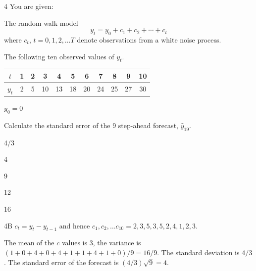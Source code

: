\begin{question}{4}
You are given:
\begin{given}
\item The random walk model
\[ y_t = y_0 + c_1 + c_2 + \cdots + c_t \]
where $c_t,\, t = 0,1,2,\ldots T$ denote observations from a white noise process.
\item The following ten observed values of $y_t$.
\begin{center}
\begin{tabular}{|c|c|c|c|c|c|c|c|c|c|c|}
\hline
$t$   & 1 & 2 & 3  & 4  & 5  & 6  & 7  & 8  & 9  & 10 \\ \hline
$y_t$ & 2 & 5 & 10 & 13 & 18 & 20 & 24 & 25 & 27 & 30 \\ \hline
\end{tabular}
\end{center}
\item $y_0 = 0$
\end{given}

Calculate the standard error of the 9 step-ahead forecast, $\hat{y}_{19}$.

\begin{choices}
\item 4/3
\item 4
\item 9
\item 12
\item 16
\end{choices}
\end{question}
\begin{solution}{4}{B}
$c_t = y_t - y_{t-1}$ and hence $c_1, c_2, \ldots c_{10} = 2,3,5,3,5,2,4,1,2,3.$

The mean of the $c$ values is 3, the variance is $(1+0+4+0+4+1+1+4+1+0)/9 = 16/9$. The standard deviation is $4/3$. The standard error of the forecast is $(4/3)\sqrt{9} = 4.$
\end{solution}

